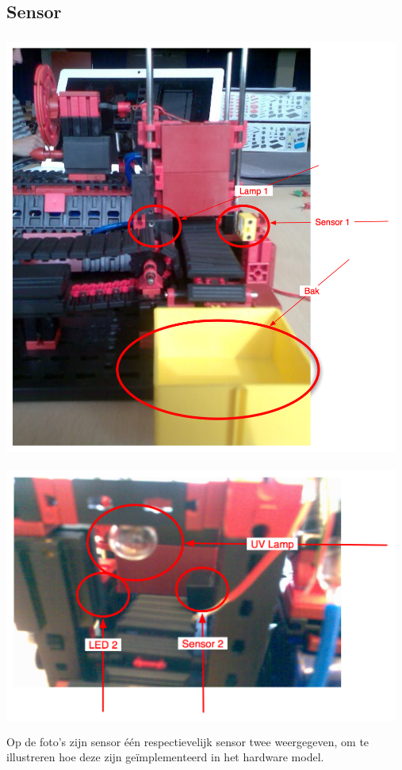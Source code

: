 \subsection{Sensor}\label{sub:sensor} %
  \includegraphics[width=13cm, height=14cm]{lamp} \\
  \includegraphics[width=13cm, height=9cm]{UVlamp} \\
  Op de foto's zijn sensor \'{e}\'{e}n respectievelijk sensor twee weergegeven, om te illustreren hoe deze zijn ge\"implementeerd in het hardware model.
  
